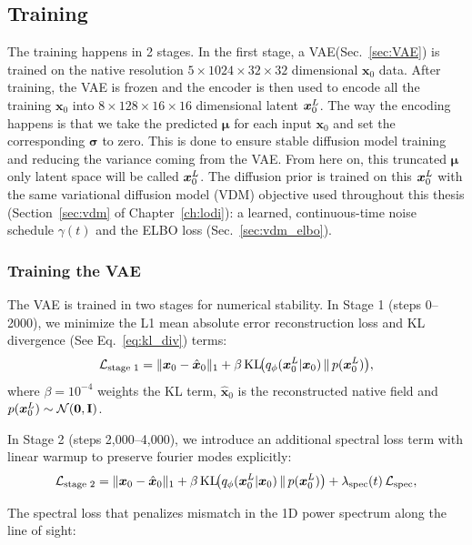 \subsection{Training}
\label{sec:dps_training}
The training happens in 2 stages. In the first stage, a VAE(Sec.~\ref{sec:VAE}) is trained on the native resolution $5\times1024\times32\times32$ dimensional $\bm{x}_0$ data. After training, the VAE is frozen and the encoder is then used to encode all the training $\bm{x}_0$ into $8\times128\times16\times16$ dimensional latent $\bm{x}_0^L$. The way the encoding happens is that we take the predicted $\bm{\mu}$ for each input $\bm{x}_0$ and set the corresponding $\bm{\sigma}$ to zero. This is done to ensure stable diffusion model training and reducing the variance coming from the VAE. From here on, this truncated $\bm{\mu}$ only latent space will be called $\bm{x}_0^L$.
The diffusion prior is trained on this $\bm{x}_0^L$ with the same variational diffusion model (VDM) objective used throughout this thesis (Section~\ref{sec:vdm} of Chapter~\ref{ch:lodi}): a learned, continuous-time noise schedule $\gamma(t)$ and the ELBO loss (Sec.~\ref{sec:vdm_elbo}). 
\subsubsection{Training the VAE}
\label{sec:VAE_training}

The VAE is trained in two stages for numerical stability. In Stage 1 (steps 0–2000), we minimize the L1 mean absolute error reconstruction loss and KL divergence (See Eq.~\ref{eq:kl_div}) terms:
\begin{equation}
\mathcal{L}_{\text{stage 1}} = \|\bm{x}_0 - \hat{\bm{x}}_0\|_1 + \beta\, \text{KL}\!\big(q_\phi(\bm{x}_0^L|\bm{x}_0) \,\|\, p(\bm{x}_0^L)\big),
\label{eq:vae_loss_stage1}
\end{equation}
where $\beta = 10^{-4}$ weights the KL term, $\hat{\bm{x}}_0$ is the reconstructed native field and $p(\bm{x}_0^L)\sim\mathcal{N}(\bm{0},\mathbf{I})$.

In Stage 2 (steps 2,000–4,000), we introduce an additional spectral loss term with linear warmup to preserve fourier modes explicitly:
\begin{equation}
\mathcal{L}_{\text{stage 2}} = \|\bm{x}_0 - \hat{\bm{x}}_0\|_1 + \beta\, \text{KL}\!\big(q_\phi(\bm{x}_0^L|\bm{x}_0) \,\|\, p(\bm{x}_0^L)\big) + \lambda_{\text{spec}}(t)\,\mathcal{L}_{\text{spec}},
\label{eq:vae_loss_stage2}
\end{equation}


The spectral loss that penalizes mismatch in the 1D power spectrum along the line of sight:

